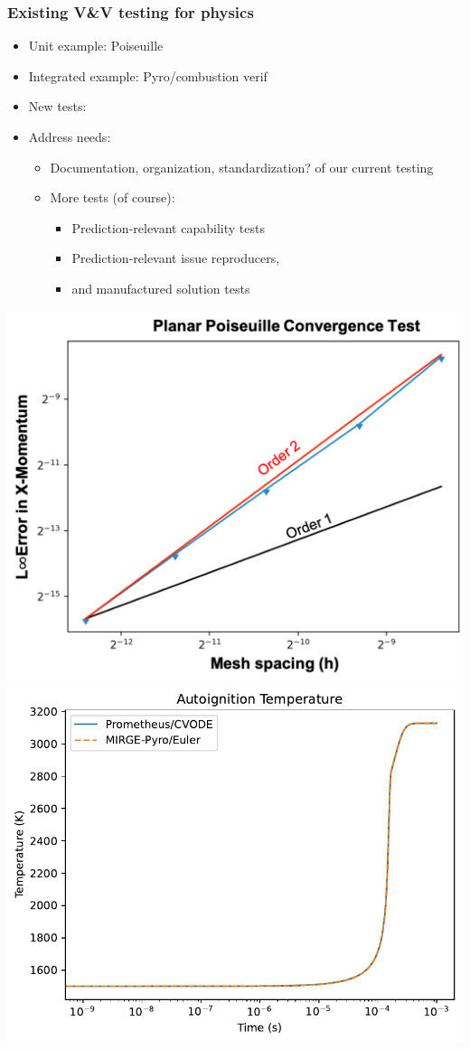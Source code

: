 \begin{frame}\frametitle{Existing \mirgecom{} V\&V testing for physics}
\begin{multicols}{2}
\begin{itemize}
\item Unit example: Poiseuille
\item Integrated example: Pyro/combustion verif
\item New tests: 
\item Address needs:
      \begin{itemize}
      \item Documentation, organization, standardization? of our current testing
      \item More tests (of course):
            \begin{itemize}
            \item Prediction-relevant capability tests
            \item Prediction-relevant issue reproducers,
            \item and manufactured solution tests
            \end{itemize}
      \end{itemize}
\end{itemize}
\columnbreak
\includegraphics[width=.4\textwidth]{figures/PoiseuilleConvergence2.png}
\includegraphics[width=.4\textwidth]{figures/autoignition_temperature.pdf}
\end{multicols}
\end{frame}

